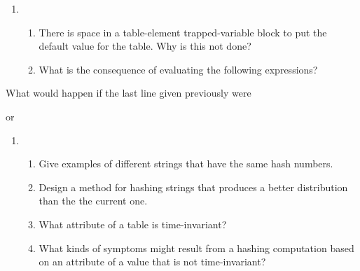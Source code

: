 \liststyleLix
\begin{enumerate}
\item \begin{enumerate}

\item There is space in a table-element trapped-variable block to put
the default value for the table. Why is this not done?

\item 
What is the consequence of evaluating the following expressions?
\end{enumerate}
\end{enumerate}

What would happen if the last line given previously were


or


\liststyleLx
\begin{enumerate}
\item \begin{enumerate}

\item Give examples of different strings that have the same hash numbers.

\item Design a method for hashing strings that produces a better
distribution than the the current one.

\item What attribute of a table is time-invariant?

\item What kinds of symptoms might result from a hashing computation
 based on an attribute of a value that is not time-invariant?

\end{enumerate}
\end{enumerate}
